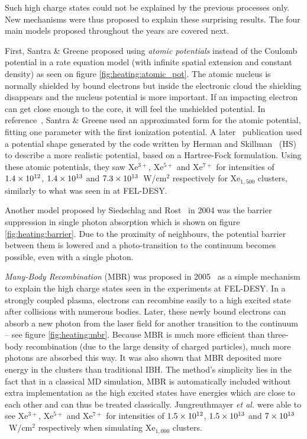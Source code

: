 Such high charge states could not be explained by the previous processes only.
New mechanisms were thus proposed to explain these surprising results.
The four main models proposed throughout the years are covered next.



First, Santra \& Greene proposed using \textit{atomic potentials} instead of
the Coulomb potential in a rate equation model (with infinite spatial
extension and
constant density) as seen on figure \ref{fig:heating:atomic_pot}.
The atomic nucleus is normally shielded by bound electrons but inside the
electronic cloud the shielding disappears and the nucleus potential is more
important. If an impacting electron can get close enough to the core, it will
feel the unshielded potential.
In reference~\cite{Greene2003}, Santra \& Greene used an approximated form for
the atomic potential, fitting one parameter with the first ionization potential.
A later~\cite{Walters2006} publication used a
potential shape generated by the code written by Herman and
Skillman~\cite{HS1963} (HS) to describe a more realistic
potential, based on a
Hartree-Fock formulation. Using these atomic potentials, they saw Xe$^{3+}$,
Xe$^{5+}$ and Xe$^{7+}$ for intensities of $\ten{1.4}{12}$, $\ten{1.4}{13}$ and
$\ten{7.3}{13}$~W/cm$^2$ respectively for Xe$_{1,500}$ clusters, similarly to
what was seen in at FEL-DESY.

\newpage
{}

Another model proposed by Siedschlag and Rost~\cite{Siedschlag2004} in 2004 was
the barrier suppression in single photon absorption which is shown on figure
\ref{fig:heating:barrier}. Due to the proximity
of neighbours, the potential barrier between them is lowered and
a photo-transition to the continuum becomes possible, even with a single photon.



\textit{Many-Body Recombination} (MBR) was proposed in 2005~\cite{Jungreuthmayer2005}
as a simple mechanism to explain the high charge states seen in the
experiments at FEL-DESY. In a strongly coupled plasma, electrons can recombine
easily to a high excited
state after collisions with numerous bodies. Later, these newly bound electrons can
absorb a new photon from the laser field for another transition to the
continuum -- see figure \ref{fig:heating:mbr}.
Because MBR is much more efficient than three-body
recombination (due to the large density of charged particles), much more
photons are absorbed this way. It was also shown that MBR deposited more energy
in the clusters than traditional IBH.
The method's simplicity
lies in the fact that in a classical MD simulation, MBR is automatically
included without extra implementation as the high excited states have energies
which are close to each other and can thus be treated classically.
Jungreuthmayer \textit{et al.} were able
to see Xe$^{3+}$, Xe$^{5+}$ and Xe$^{7+}$ for intensities of $\ten{1.5}{12}$,
$\ten{1.5}{13}$ and $\ten{7}{13}$~W/cm$^2$ respectively when simulating
Xe$_{1,000}$ clusters.

